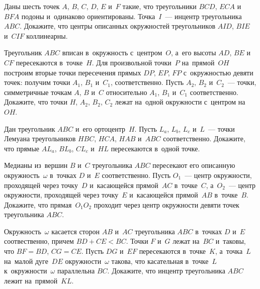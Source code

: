 


\begin{problems}

\item
Даны шесть точек $A$, $B$, $C$, $D$, $E$ и~$F$ такие, что
треугольники $BCD$, $ECA$ и~$BFA$ подоны и~одинаково ориентированы.
Точка~$I$~--- инцентр треугольника $ABC$.
Докажите, что центры описанных окружностей треугольников $AID$, $BIE$ и~$CIF$
коллинеарны.

\item
Треугольник $ABC$ вписан в~окружность с~центром~$O$, а~его
высоты $AD$, $BE$ и~$CF$ пересекаются в~точке~$H$.
Для произвольной точки~$P$ на~прямой~$OH$ построим вторые точки пересечения
прямых $DP$, $EP$, $FP$ с~окружностью девяти точек:
получим точки $A_{1}$, $B_{1}$ и~$C_{1}$, соответственно.
Пусть $A_{2}$, $B_{2}$ и~$C_{2}$~--- точки, симметричные точкам $A$, $B$ и~$C$
относительно $A_{1}$, $B_{1}$ и~$C_{1}$ соответственно.
Докажите, что точки $H$, $A_{2}$, $B_{2}$, $C_{2}$ лежат на~одной окружности
с~центром на~$OH$.

\item
Дан треугольник $ABC$ и~его ортоцентр~$H$.
Пусть $L_{a}$, $L_{b}$, $L_{c}$ и~$L$~--- точки Лемуана
треугольников $HBC$, $HCA$, $HAB$ и~$ABC$ соответственно.
Докажите, что прямые $AL_{a}$, $BL_{b}$, $CL_{c}$ и~$HL$ пересекаются
в~одной точке.

\item
Медианы из~вершин $B$ и~$C$ треугольника $ABC$ пересекают его описанную
окружность~$\omega$ в~точках $D$ и~$E$ соответственно.
Пусть $O_{1}$~--- центр окружности, проходящей через точку~$D$ и~касающейся
прямой~$AC$ в~точке~$C$, а~$O_{2}$~--- центр окружности, проходящей через
точку~$E$ и~касающейся прямой~$AB$ в~точке~$B$.
Докажите, что прямая~$O_{1}O_{2}$ проходит через центр окружности девяти точек
треугольника $ABC$.

\item
Окружность~$\omega$ касается сторон $AB$ и~$AC$ треугольника $ABC$
в~точках $D$ и~$E$ соотвественно, причем $BD + CE < BC$.
Точки $F$ и~$G$ лежат на~$BC$ и~таковы, что $BF = BD$, $CG = CE$.
Пусть $DG$ и~$EF$ пересекаются в~точке~$K$, а~точка~$L$ на~малой дуге~$DE$
окружности~$\omega$ такова, что касательная в~точке~$L$ к~окружности~$\omega$
параллельна $BC$.
Докажите, что инцентр треугольника $ABC$ лежит на~прямой~$KL$.

\end{problems}

